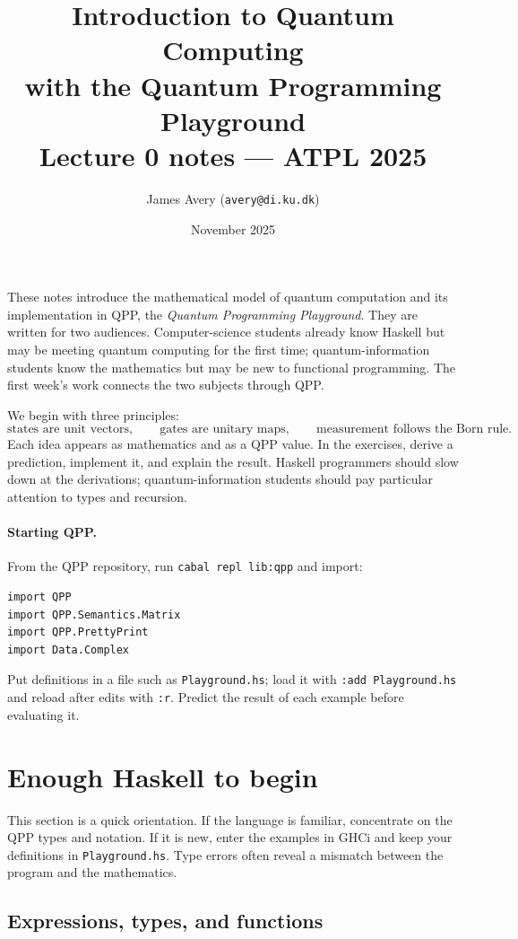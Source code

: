 \documentclass[11pt,a4paper]{article}
\title{Introduction to Quantum Computing\\
       {\large with the Quantum Programming Playground}\\[1ex]
       {\normalsize Lecture 0 notes --- ATPL 2025}}
\author{James Avery (\texttt{avery@di.ku.dk})}
\date{November 2025}
\theoremstyle{definition}
\begin{document}
\maketitle

These notes introduce the mathematical model of quantum computation and its
implementation in QPP, the \emph{Quantum Programming Playground}.  They are
written for two audiences.  Computer-science students already know Haskell
but may be meeting quantum computing for the first time; quantum-information
students know the mathematics but may be new to functional programming.
The first week's work connects the two subjects through QPP.

We begin with three principles:
\[
  \text{states are unit vectors},\qquad
  \text{gates are unitary maps},\qquad
  \text{measurement follows the Born rule}.
\]
Each idea appears as mathematics and as a QPP value.  In the exercises, derive
a prediction, implement it, and explain the result.  Haskell programmers
should slow down at the derivations; quantum-information students should pay
particular attention to types and recursion.

\paragraph{Starting QPP.}
From the QPP repository, run \lstinline|cabal repl lib:qpp| and import:
\begin{lstlisting}
import QPP
import QPP.Semantics.Matrix
import QPP.PrettyPrint
import Data.Complex
\end{lstlisting}
Put definitions in a file such as \texttt{Playground.hs}; load it with
\lstinline|:add Playground.hs| and reload after edits with \lstinline|:r|.
Predict the result of each example before evaluating it.

\section{Enough Haskell to begin}
\label{sec:haskell}

This section is a quick orientation.
If the language is familiar, concentrate on the QPP types and notation.  If
it is new, enter the examples in GHCi and keep your definitions in
\texttt{Playground.hs}.  Type errors often reveal a mismatch between the
program and the mathematics.

\subsection{Expressions, types, and functions}
\end{document}
